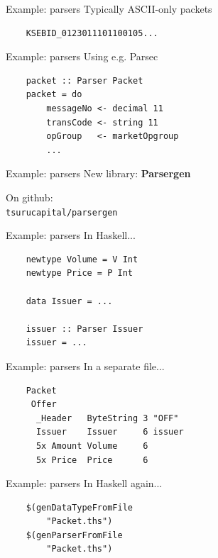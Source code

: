 \documentclass[20pt]{beamer}
\newcommand{\vspaced}{
    \vspace{5mm}
}
\begin{document}
\begin{frame}[fragile]{Example: parsers}
    Typically ASCII-only packets
    \vspaced
    \begin{lstlisting}
    KSEBID_0123011101100105...
    \end{lstlisting}
\end{frame}

\begin{frame}[fragile]{Example: parsers}
    Using e.g. Parsec \\
    \vspaced
    \begin{lstlisting}
    packet :: Parser Packet
    packet = do
        messageNo <- decimal 11
        transCode <- string 11
        opGroup   <- marketOpgroup
        ...
    \end{lstlisting}
\end{frame}

\begin{frame}{Example: parsers}
    New library: \textbf{Parsergen} \\
    \vspaced
    On github: \\
    \texttt{tsurucapital/parsergen}
\end{frame}

\begin{frame}[fragile]{Example: parsers}
    In Haskell... \\
    \vspaced
    \begin{lstlisting}
    newtype Volume = V Int
    newtype Price = P Int

    data Issuer = ...

    issuer :: Parser Issuer
    issuer = ...
    \end{lstlisting}
\end{frame}

\begin{frame}[fragile]{Example: parsers}
    In a separate file...
    \vspaced
    \begin{lstlisting}
    Packet
     Offer
      _Header   ByteString 3 "OFF"
      Issuer    Issuer     6 issuer
      5x Amount Volume     6
      5x Price  Price      6
    \end{lstlisting}
\end{frame}

\begin{frame}[fragile]{Example: parsers}
    In Haskell again... \\
    \vspaced
    \begin{lstlisting}
    $(genDataTypeFromFile
        "Packet.ths")
    $(genParserFromFile
        "Packet.ths")
    \end{lstlisting}
\end{frame}
\end{document}
